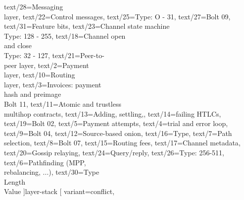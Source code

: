 \documentclass[aspectratio=169]{beamer}
\begin{document}
  text/28={Messaging\\layer},
  text/22={Control messages},
  text/25={Type: O - 31},
  text/27={Bolt 09},
  text/31={Feature bits},
  text/23={Channel state machine\\Type: 128 - 255},
  text/18={Channel open\\and close\\Type: 32 - 127},
  text/21={Peer-to-\\peer layer},
  text/2={Payment\\layer},
  text/10={Routing\\layer},
  text/3={Invoices: payment\\hash and preimage\\Bolt 11},
  text/11={Atomic and trustless\\multihop contracts},
  text/13={Adding, settling,},
  text/14={failing HTLCs},
  text/19={Bolt 02},
  text/5={Payment attempts},
  text/4={trial and error loop},
  text/9={Bolt 04},
  text/12={Source-based onion},
  text/16={Type},
  text/7={Path selection},
  text/8={Bolt 07},
  text/15={Routing fees},
  text/17={Channel metadata},
  text/20={Gossip relaying},
  text/24={Query/reply},
  text/26={Type: 256-511},
  text/6={Pathfinding (MPP,\\rebalancing, ...)},
  text/30={Type\\Length\\Value}
]{layer-stack}
\gdef\studiocataloguename{\detokenize{multi-signature}}
\gdef\studiocataloguename{\detokenize{blockchain-with-list}}
\gdef\studiocataloguename{\detokenize{double-spend-diagram}}
\studiotemplate[
  variant={conflict},
\end{document}
